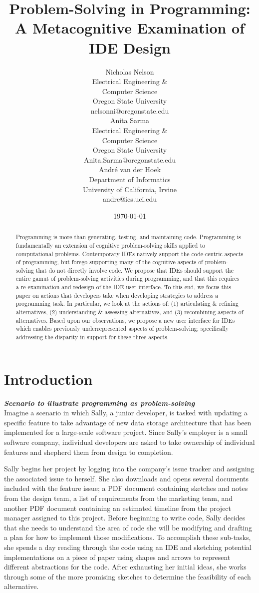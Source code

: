 \documentclass{ppig}
\title{Problem-Solving in Programming: A Metacognitive Examination of IDE Design}
\author{Nicholas Nelson \\
  Electrical Engineering \&\\ Computer Science \\
  Oregon State University \\
  nelsonni@oregonstate.edu \\
  \And
  Anita Sarma \\
  Electrical Engineering \&\\ Computer Science \\
  Oregon State University \\
  Anita.Sarma@oregonstate.edu \\
  \And
  André van der Hoek \\
  Department of Informatics \\
  University of California, Irvine \\
  andre@ics.uci.edu
}
\date{\today}
\newcommand{\bold}[1]{\textit{\textbf{\color{aoblue}#1}}}
\begin{document}
\maketitle
\thispagestyle{empty}

\begin{abstract}

Programming is more than generating, testing, and maintaining code.
Programming is fundamentally an extension of cognitive problem-solving skills applied to computational problems.
Contemporary IDEs natively support the code-centric aspects of programming, but forego supporting many of the cognitive aspects of problem-solving that do not directly involve code.
We propose that IDEs should support the entire gamut of problem-solving activities during programming, and that this requires a re-examination and redesign of the IDE user interface.
To this end, we focus this paper on actions that developers take when developing strategies to address a programming task.
In particular, we look at the actions of: (1) articulating \& refining alternatives, (2) understanding \& assessing alternatives, and (3) recombining aspects of alternatives.
Based upon our observations, we propose a new user interface for IDEs which enables previously underrepresented aspects of problem-solving; specifically addressing the disparity in support for these three aspects. 
\end{abstract}

\section{Introduction}
\bold{Scenario to illustrate programming as problem-solving\\}
Imagine a scenario in which Sally, a junior developer, is tasked with updating a specific feature to take advantage of new data storage architecture that has been implemented for a large-scale software project.
Since Sally's employer is a small software company, individual developers are asked to take ownership of individual features and shepherd them from design to completion.

Sally begins her project by logging into the company's issue tracker and assigning the associated issue to herself.
She also downloads and opens several documents included with the feature issue; a PDF document containing sketches and notes from the design team, a list of requirements from the marketing team, and another PDF document containing an estimated timeline from the project manager assigned to this project.
Before beginning to write code, Sally decides that she needs to understand the area of code she will be modifying and drafting a plan for how to implement those modifications.
To accomplish these sub-tasks, she spends a day reading through the code using an IDE and sketching potential implementations on a piece of paper using shapes and arrows to represent different abstractions for the code.
After exhausting her initial ideas, she works through some of the more promising sketches to determine the feasibility of each alternative.
\end{document}
